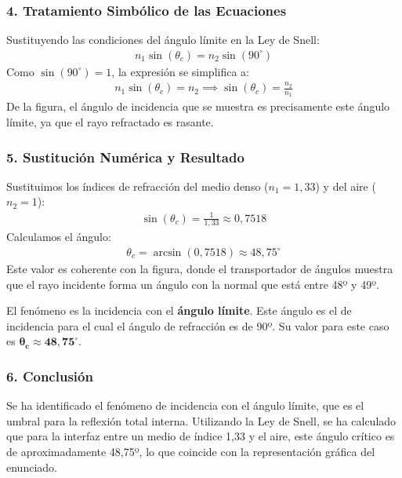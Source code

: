 \subsubsection*{4. Tratamiento Simbólico de las Ecuaciones}
Sustituyendo las condiciones del ángulo límite en la Ley de Snell:
\begin{gather}
    n_1 \sin(\theta_c) = n_2 \sin(90^\circ)
\end{gather}
Como $\sin(90^\circ) = 1$, la expresión se simplifica a:
\begin{gather}
    n_1 \sin(\theta_c) = n_2 \implies \sin(\theta_c) = \frac{n_2}{n_1}
\end{gather}
De la figura, el ángulo de incidencia que se muestra es precisamente este ángulo límite, ya que el rayo refractado es rasante.

\subsubsection*{5. Sustitución Numérica y Resultado}
Sustituimos los índices de refracción del medio denso ($n_1=1,33$) y del aire ($n_2=1$):
\begin{gather}
    \sin(\theta_c) = \frac{1}{1,33} \approx 0,7518
\end{gather}
Calculamos el ángulo:
\begin{gather}
    \theta_c = \arcsin(0,7518) \approx 48,75^\circ
\end{gather}
Este valor es coherente con la figura, donde el transportador de ángulos muestra que el rayo incidente forma un ángulo con la normal que está entre 48º y 49º.
\begin{cajaresultado}
El fenómeno es la incidencia con el \textbf{ángulo límite}. Este ángulo es el de incidencia para el cual el ángulo de refracción es de 90º. Su valor para este caso es $\boldsymbol{\theta_c \approx 48,75^\circ}$.
\end{cajaresultado}

\subsubsection*{6. Conclusión}
\begin{cajaconclusion}
Se ha identificado el fenómeno de incidencia con el ángulo límite, que es el umbral para la reflexión total interna. Utilizando la Ley de Snell, se ha calculado que para la interfaz entre un medio de índice 1,33 y el aire, este ángulo crítico es de aproximadamente 48,75º, lo que coincide con la representación gráfica del enunciado.
\end{cajaconclusion}

